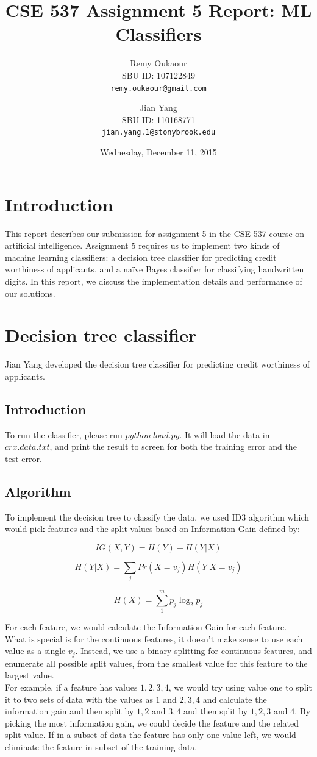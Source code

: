 \documentclass[11pt]{article}
\title{CSE 537 Assignment 5 Report: ML Classifiers}
\author{
Remy Oukaour \\
	{\small SBU ID: 107122849}\\
	{\small \texttt{remy.oukaour@gmail.com}}
\and
Jian Yang \\
	{\small SBU ID: 110168771}\\
	{\small \texttt{jian.yang.1@stonybrook.edu}}
}
\date{Wednesday, December 11, 2015}
\begin{document}
\maketitle

\section{Introduction}

This report describes our submission for assignment 5 in the CSE 537 course on
artificial intelligence. Assignment 5 requires us to implement two kinds of
machine learning classifiers: a decision tree classifier for predicting credit
worthiness of applicants, and a na{\"i}ve Bayes classifier for classifying
handwritten digits. In this report, we discuss the implementation details and
performance of our solutions.

\section{Decision tree classifier}

Jian Yang developed the decision tree classifier for predicting credit worthiness
of applicants.

\subsection{Introduction}
To run the classifier, please run $python\ load.py$. It will load the data in $crx.data.txt$,
and print the result to screen for both the training error and the test error.

\subsection{Algorithm}

To implement the decision tree to classify the data, we used  ID3 algorithm which would pick features
and the split values based on Information Gain defined by:

$$IG(X,Y) = H(Y) - H(Y|X)$$

$$H(Y|X) = \sum_jPr(X=v_j)H(Y|X=v_j)$$

$$H(X) = \sum_{1}^m p_j \log_2{p_j} $$

For each feature, we would calculate the Information Gain for each feature. \\
What is special is for the continuous features, it doesn't make sense to use each value as a single $v_j$.
Instead, we use a binary splitting for continuous features, and enumerate all possible split values, from the smallest value
for this feature to the largest value. \\
For example, if a feature has values $1, 2, 3, 4$, we would try using value one to split it to two sets of data
with the values as $1$ and $2, 3, 4$ and calculate the information gain and then split by $1, 2$ and $3, 4$ and then 
split by $1, 2, 3$ and $4$. By picking the most information gain, we could decide the feature and the related split value.
If in a subset of data the feature has only one value left, we would eliminate the feature in subset of the training data.
\end{document}
